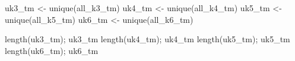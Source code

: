 \documentclass[
  letterpaper,
]{article}
\newenvironment{Shaded}{\begin{snugshade}}{\end{snugshade}}
\newcommand{\FunctionTok}[1]{\textcolor[rgb]{0.28,0.35,0.67}{#1}}
\newcommand{\NormalTok}[1]{\textcolor[rgb]{0.00,0.23,0.31}{#1}}
\newcommand{\OtherTok}[1]{\textcolor[rgb]{0.00,0.23,0.31}{#1}}
\begin{document}
\begin{Shaded}
\begin{Highlighting}[]
\NormalTok{uk3\_tm }\OtherTok{\textless{}{-}} \FunctionTok{unique}\NormalTok{(all\_k3\_tm)}
\NormalTok{uk4\_tm }\OtherTok{\textless{}{-}} \FunctionTok{unique}\NormalTok{(all\_k4\_tm)}
\NormalTok{uk5\_tm }\OtherTok{\textless{}{-}} \FunctionTok{unique}\NormalTok{(all\_k5\_tm)}
\NormalTok{uk6\_tm }\OtherTok{\textless{}{-}} \FunctionTok{unique}\NormalTok{(all\_k6\_tm)}

\FunctionTok{length}\NormalTok{(uk3\_tm); uk3\_tm}
\FunctionTok{length}\NormalTok{(uk4\_tm); uk4\_tm}
\FunctionTok{length}\NormalTok{(uk5\_tm); uk5\_tm}
\FunctionTok{length}\NormalTok{(uk6\_tm); uk6\_tm}
\end{Highlighting}
\end{Shaded}
\end{document}
